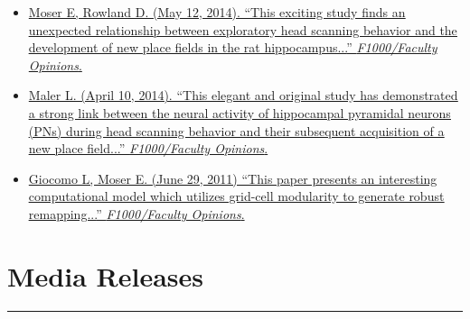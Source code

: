 \documentclass[10pt]{article}
\newcommand{\itemtitle}[1]{{\color{hopkinsblue}\ul{#1}}}
\newcommand{\newsection}[2]{%
  \section*{#1}
  \vspace{-.125in}
  \hrule
  \vspace{.22in}
  \label{sec:#2}
}
\begin{document}
\begin{itemize}
  \item \href{https://facultyopinions.com/prime/718333676#eval793494783}
    {Moser E, Rowland D. (May 12, 2014). ``\itemtitle{This exciting study finds
        an unexpected relationship between exploratory head scanning behavior
      and the development of new place fields in the rat hippocampus...}”
    \emph{F1000/Faculty Opinions}.}
  \item \href{https://facultyopinions.com/prime/718333676#eval793493493}
    {Maler L. (April 10, 2014). ``\itemtitle{This elegant and original study has
        demonstrated a strong link between the neural activity of hippocampal pyramidal
        neurons (PNs) during head scanning behavior and their subsequent acquisition of
    a new place field...}'' \emph{F1000/Faculty Opinions}.}
  \item \href{https://facultyopinions.com/prime/11553956}
    {Giocomo L, Moser E. (June 29, 2011) ``\itemtitle{This paper presents an
        interesting computational model which utilizes grid-cell modularity to generate
    robust remapping...}'' \emph{F1000/Faculty Opinions}.}
\end{itemize}


\smallskip
\newsection{Media Releases}{pr}
\end{document}

